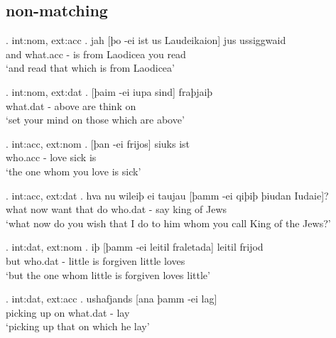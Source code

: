 \subsection{non-matching}

\ex. \ac{int}:\ac{nom}, \ac{ext}:\ac{acc}
\ag. jah [þo -ei ist us Laudeikaion] jus ussiggwaid\\
 and what.\ac{acc} - is\scsub{[nom]} from Laodicea you read\scsub{[acc]}\\
 `and read that which is from Laodicea' 

\ex. \ac{int}:\ac{nom}, \ac{ext}:\ac{dat}
\ag. [þaim -ei iupa sind] fraþjaiþ\\
 what.\ac{dat} - above are\scsub{[nom]} {think on}\scsub{[dat]}\\
 `set your mind on those which are above' 

\ex. \ac{int}:\ac{acc}, \ac{ext}:\ac{nom}
\ag. [þan -ei frijos] siuks ist\\
 who.\ac{acc} - love\scsub{[acc]} sick is\scsub{[nom]}\\
 `the one whom you love is sick' 

\ex. \ac{int}:\ac{acc}, \ac{ext}:\ac{dat}
\ag. hva nu wileiþ ei taujau [þamm -ei qiþiþ þiudan Iudaie]?\\
 what now want that do\scsub{[dat]} who.\ac{dat} - say\scsub{[acc]} king {of Jews}\\
 `what now do you wish that I do to him whom you call King of the Jews?' 

\ex. \ac{int}:\ac{dat}, \ac{ext}:\ac{nom}
\ag. iþ [þamm -ei leitil fraletada] leitil frijod\\
 but who.\ac{dat} - little {is forgiven\scsub{[dat]}} little loves\scsub{[nom]}\\
 `but the one whom little is forgiven loves little' 

\ex. \ac{int}:\ac{dat}, \ac{ext}:\ac{acc}
\ag. ushafjands [ana þamm -ei lag]\\
 {picking up}\scsub{[acc]} on\scsub{[dat]} what.\ac{dat} - lay\\
 `picking up that on which he lay' 


